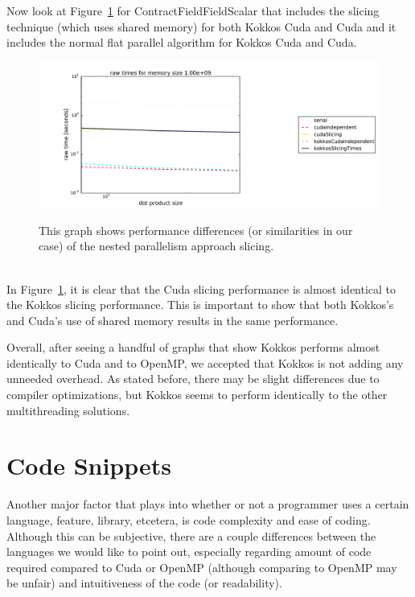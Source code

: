 Now look at Figure~\ref{fig:cffscomparison} for ContractFieldFieldScalar that includes the slicing technique (which uses shared memory)
for both Kokkos Cuda and Cuda and it includes the normal flat parallel algorithm for Kokkos Cuda and Cuda. \\
\begin{figure}[!ht]
{\includegraphics[scale=.4]{CFFS_RawTimes_2d_largest_Comparison.pdf}}
\caption[ContractFieldFieldScalar Kokkos performance comparison]{This graph shows performance differences (or similarities in our case)
of the nested parallelism approach slicing.}
\label{fig:cffscomparison}
\end{figure} \\
In Figure~\ref{fig:cffscomparison}, it is clear that the Cuda slicing performance is almost identical
to the Kokkos slicing performance. This is important to show that both Kokkos's
and Cuda's use of shared memory results in the same performance. 

Overall, after seeing a handful of graphs that show Kokkos performs almost
identically to Cuda and to OpenMP, we accepted that Kokkos is not adding any
unneeded overhead. As stated before, there may be slight differences due to
compiler optimizations, but Kokkos seems to perform identically to the other
multithreading solutions.

\section{Code Snippets}
Another major factor that plays into whether or not a programmer uses a certain
language, feature, library, etcetera, is code complexity and ease of coding.
Although this can be subjective, there are a couple differences between the
languages we would like to point out, especially regarding amount of code
required compared to Cuda or OpenMP (although comparing to OpenMP may be unfair)
and intuitiveness of the code (or readability). 

